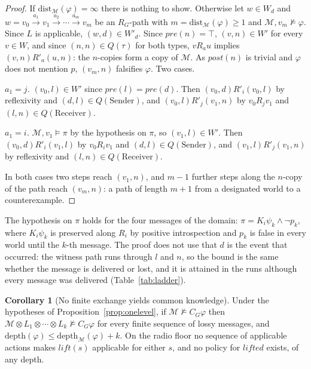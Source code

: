 \documentclass[11pt,a4paper]{article}
\theoremstyle{definition}
\newtheorem{corollary}{Corollary}
\newcommand{\Mod}{\mathcal{M}}
\newcommand{\prd}{\otimes}
\newcommand{\Kop}[1]{K_{#1}}
\newcommand{\Cop}[1]{C_{#1}}
\newcommand{\pre}{\mathit{pre}}
\newcommand{\post}{\mathit{post}}
\newcommand{\dist}{\mathrm{dist}}
\newcommand{\depth}{\mathrm{depth}}
\begin{document}
\begin{proof}
If $\dist_\Mod(\varphi) = \infty$ there is nothing to show. Otherwise let
$w \in W_d$ and $w = v_0 \xrightarrow{a_1} v_1 \xrightarrow{a_2} \cdots
\xrightarrow{a_m} v_m$ be an $R_G$-path with $m = \dist_\Mod(\varphi) \geq 1$ and
$\Mod, v_m \not\models \varphi$. Since $L$ is applicable, $(w,d) \in W'_d$.
Since $\pre(n) = \top$, $(v,n) \in W'$ for every $v \in W$, and since
$(n,n) \in Q(\tau)$ for both types, $v R_a u$ implies $(v,n) R'_a (u,n)$:
the $n$-copies form a copy of $\Mod$. As $\post(n)$ is trivial and $\varphi$ does
not mention $p$, $(v_m, n)$ falsifies $\varphi$. Two cases.

\emph{$a_1 = j$.} $(v_0,l) \in W'$ since $\pre(l) = \pre(d)$. Then
$(v_0,d) \mathrel{R'_i} (v_0,l)$ by reflexivity and $(d,l) \in Q(\mathrm{Sender})$,
and $(v_0,l) \mathrel{R'_j} (v_1,n)$ by $v_0 R_j v_1$ and
$(l,n) \in Q(\mathrm{Receiver})$.

\emph{$a_1 = i$.} $\Mod, v_1 \models \pi$ by the hypothesis on $\pi$, so
$(v_1,l) \in W'$. Then $(v_0,d) \mathrel{R'_i} (v_1,l)$ by $v_0 R_i v_1$ and
$(d,l) \in Q(\mathrm{Sender})$, and $(v_1,l) \mathrel{R'_j} (v_1,n)$ by
reflexivity and $(l,n) \in Q(\mathrm{Receiver})$.

In both cases two steps reach $(v_1, n)$, and $m-1$ further steps along the
$n$-copy of the path reach $(v_m,n)$: a path of length $m+1$ from a designated
world to a counterexample.
\end{proof}

\noindent
The hypothesis on $\pi$ holds for the four messages of the domain:
$\pi = \Kop{i}\psi_k \wedge \neg p_k$, where $\Kop{i}\psi_k$ is preserved along
$R_i$ by positive introspection and $p_k$ is false in every world until the
$k$-th message. The proof does not use that $d$ is the event that occurred: the
witness path runs through $l$ and $n$, so the bound is the same whether the
message is delivered or lost, and it is attained in the runs although every
message was delivered (Table~\ref{tab:ladder}).

\begin{corollary}[No finite exchange yields common knowledge]
\label{cor:radio}
Under the hypotheses of Proposition~\ref{prop:onelevel}, if
$\Mod \not\models \Cop{G}\varphi$ then
$\Mod \prd L_1 \prd \cdots \prd L_k \not\models \Cop{G}\varphi$ for every finite
sequence of lossy messages, and
$\depth(\varphi) \leq \depth_\Mod(\varphi) + k$. On the radio floor no sequence
of applicable actions makes $\mathit{lift}(s)$ applicable for either $s$, and no
policy for $\mathit{lifted}$ exists, of any depth.
\end{corollary}
\end{document}
